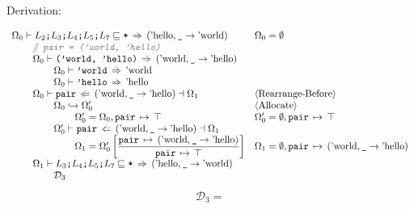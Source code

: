 \documentclass[12pt,twoside]{report}
\begin{document}
Derivation:

{\smaller
\[\begin{array}{ll}
  \Omega_0 \vdash L_2\mono{;}L_3\mono{;}L_4\mono{;}L_5\mono{;}L_7 \subtype \mono{*} \movearrowabs (\atom{hello}, \mono{\_} \rightarrow \atom{world}) &
  \Omega_0 = \emptyset \\

  \otab \ocomment{\mono{pair = ('world, 'hello)}} \\
  \otab \Omega_0 \vdash \mono{('world, 'hello)} \movearrowabs (\atom{world}, \mono{\_} \rightarrow \atom{hello}) \\
  \otab \otab \Omega_0 \vdash \mono{'world} \movearrowabs \atom{world} \\
  \otab \otab \Omega_0 \vdash \mono{'hello} \movearrowabs \atom{hello} \\
  \otab\Omega_0 \vdash \mono{pair} \writearrowabs (\atom{world}, \mono{\_} \rightarrow \atom{hello}) \dashv \Omega_1 &
   \langle\text{Rearrange-Before}\rangle \\
  \otab\otab \Omega_0 \rearrangearrow \Omega_0' &
   \langle\text{Allocate}\rangle \\
  \otab\otab\otab \Omega_0' = \Omega_0,\absmapm{pair}{\top} &
   \Omega_0' = \emptyset, \absmapm{pair}{\top} \\
  \otab \otab \Omega_0' \vdash \mono{pair} \writearrowabs (\atom{world}, \mono{\_} \rightarrow \atom{hello}) \dashv \Omega_1 \\
  \otab\otab\otab \Omega_1 = \Omega_0'\left[\dfrac{\absmapm{pair}{(\atom{world}, \mono{\_} \rightarrow \atom{hello})}}{\absmapm{pair}{\top}}\right] &
   \Omega_1 = \emptyset,\absmapm{pair}{(\atom{world}, \mono{\_} \rightarrow \atom{hello})}\\
  \otab \Omega_1 \vdash L_3\mono{;}L_4\mono{;}L_5\mono{;}L_7 \subtype \mono{*} \movearrowabs (\atom{hello}, \mono{\_} \rightarrow \atom{world}) \\
  \otab \otab \mathcal{D}_3 \\

\end{array}\]
\[\begin{array}{ll}
  \mathcal{D}_3 = \\\\


\end{array}\]}
\end{document}
